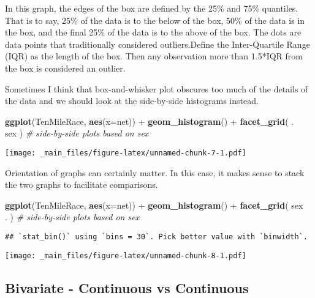 \documentclass[]{book}
\newenvironment{Shaded}{\begin{snugshade}}{\end{snugshade}}
\newcommand{\KeywordTok}[1]{\textcolor[rgb]{0.13,0.29,0.53}{\textbf{{#1}}}}
\newcommand{\DataTypeTok}[1]{\textcolor[rgb]{0.13,0.29,0.53}{{#1}}}
\newcommand{\StringTok}[1]{\textcolor[rgb]{0.31,0.60,0.02}{{#1}}}
\newcommand{\CommentTok}[1]{\textcolor[rgb]{0.56,0.35,0.01}{\textit{{#1}}}}
\newcommand{\NormalTok}[1]{{#1}}
\begin{document}
In this graph, the edges of the box are defined by the 25\% and 75\%
quantiles. That is to say, 25\% of the data is to the below of the box,
50\% of the data is in the box, and the final 25\% of the data is to the
above of the box. The dots are data points that traditionally considered
outliers.Define the Inter-Quartile Range (IQR) as the length of the box.
Then any observation more than 1.5*IQR from the box is considered an
outlier.

Sometimes I think that box-and-whisker plot obscures too much of the
details of the data and we should look at the side-by-side histograms
instead.

\begin{Shaded}
\begin{Highlighting}[]
\KeywordTok{ggplot}\NormalTok{(TenMileRace, }\KeywordTok{aes}\NormalTok{(}\DataTypeTok{x=}\NormalTok{net)) +}
\StringTok{  }\KeywordTok{geom_histogram}\NormalTok{() +}
\StringTok{  }\KeywordTok{facet_grid}\NormalTok{( . ~}\StringTok{ }\NormalTok{sex )  }\CommentTok{# side-by-side plots based on sex}
\end{Highlighting}
\end{Shaded}

\texttt{[image: \_main\_files/figure-latex/unnamed-chunk-7-1.pdf]}

Orientation of graphs can certainly matter. In this case, it makes sense
to stack the two graphs to facilitate comparisons.

\begin{Shaded}
\begin{Highlighting}[]
\KeywordTok{ggplot}\NormalTok{(TenMileRace, }\KeywordTok{aes}\NormalTok{(}\DataTypeTok{x=}\NormalTok{net)) +}
\StringTok{  }\KeywordTok{geom_histogram}\NormalTok{() +}
\StringTok{  }\KeywordTok{facet_grid}\NormalTok{( sex ~}\StringTok{ }\NormalTok{. )  }\CommentTok{# side-by-side plots based on sex}
\end{Highlighting}
\end{Shaded}

\begin{verbatim}
## `stat_bin()` using `bins = 30`. Pick better value with `binwidth`.
\end{verbatim}

\texttt{[image: \_main\_files/figure-latex/unnamed-chunk-8-1.pdf]}

\subsection{Bivariate - Continuous vs
Continuous}\label{bivariate---continuous-vs-continuous}
\end{document}
